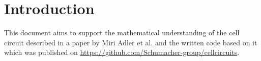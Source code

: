 \documentclass[a4paper]{article}
\begin{document}
\maketitle


\tableofcontents

\newpage

\section{Introduction}
This document aims to support the mathematical understanding of the cell circuit described in a paper by Miri Adler et al. \cite{PrinCellCircuits} and the written code based on it which was published on \url{https://github.com/Schumacher-group/cellcircuits}. 



\printindex
\printbibliography
\end{document}
